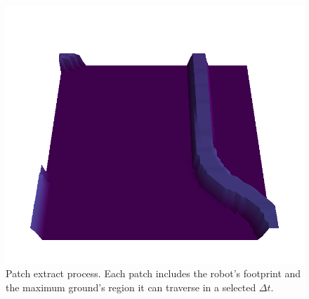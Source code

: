 \documentclass[twocolumn,showpacs,
  nofootinbib,aps,superscriptaddress,
  eqsecnum,prd,notitlepage,showkeys,10pt]{revtex4-1}
\begin{document}
\begin{figure}[H]
\begin{minipage}[t]{0.4\linewidth}
      \includegraphics[width=\linewidth]{images/crop/test-1-3d.png}
    \end{minipage}
\caption{Patch extract process. Each patch includes the robot's footprint and the maximum ground's region it can traverse in a selected $\Delta t$.}
\end{figure}
\end{document}
